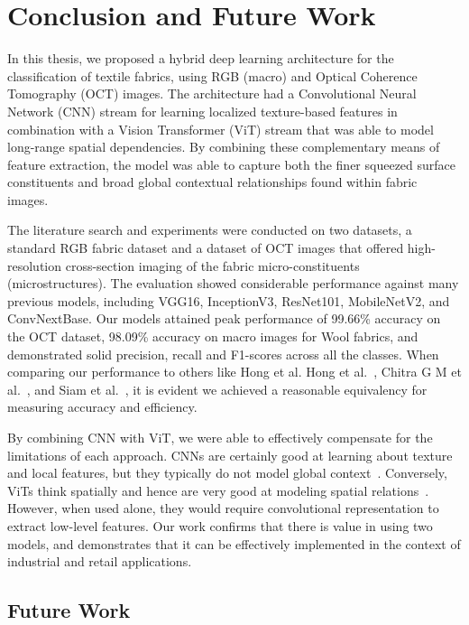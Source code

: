 \section{Conclusion and Future Work}

In this thesis, we proposed a hybrid deep learning architecture for the classification of textile fabrics, using RGB (macro) and Optical Coherence Tomography (OCT) images. The architecture had a Convolutional Neural Network (CNN) stream for learning localized texture-based features in combination with a Vision Transformer (ViT) stream that was able to model long-range spatial dependencies. By combining these complementary means of feature extraction, the model was able to capture both the finer squeezed surface constituents and broad global contextual relationships found within fabric images.

The literature search and experiments were conducted on two datasets, a standard RGB fabric dataset and a dataset of OCT images that offered high-resolution cross-section imaging of the fabric micro-constituents (microstructures). The evaluation showed considerable performance against many previous models, including VGG16, InceptionV3, ResNet101, MobileNetV2, and ConvNextBase. Our models attained peak performance of 99.66\% accuracy on the OCT dataset, 98.09\% accuracy on macro images for Wool fabrics, and demonstrated solid precision, recall and F1-scores across all the classes. When comparing our performance to others like Hong et al.  Hong et al.~\cite{hong2024research}, Chitra G M et al.~\cite{chitra2023fabric}, and Siam et al.~\cite{siam2023textilenet}, it is evident we achieved a reasonable equivalency for measuring accuracy and efficiency.

By combining CNN with ViT, we were able to effectively compensate for the limitations of each approach. CNNs are certainly good at learning about texture and local features, but they typically do not model global context~\cite{simonyan2015vgg}. Conversely, ViTs think spatially and hence are very good at modeling spatial relations~\cite{dosovitskiy2020vit}. However, when used alone, they would require convolutional representation to extract low-level features. Our work confirms that there is value in using two models, and demonstrates that it can be effectively implemented in the context of industrial and retail applications.

\subsection*{Future Work}

